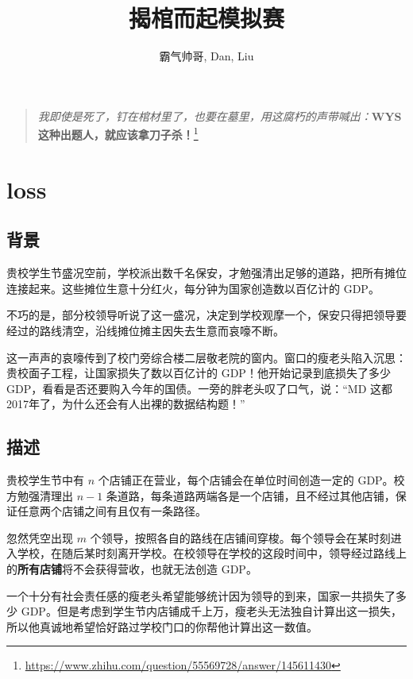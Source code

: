 \documentclass{ctexart}
\begin{document}
\title{揭棺而起模拟赛}
\author{霸气帅哥, Dan, Liu}

\maketitle

\newpage

\vspace*{\fill}
\begin{quote}
  \textit{我即使是死了，钉在棺材里了，也要在墓里，用这腐朽的声带喊出：}\textbf{WYS 这种出题人，就应该拿刀子杀！}\footnote{\url{https://www.zhihu.com/question/55569728/answer/145611430}}
\end{quote}
\vspace*{\fill}

\newpage

\section{loss}
\subsection{背景}
贵校学生节盛况空前，学校派出数千名保安，才勉强清出足够的道路，把所有摊位连接起来。这些摊位生意十分红火，每分钟为国家创造数以百亿计的 GDP。

不巧的是，部分校领导听说了这一盛况，决定到学校观摩一个，保安只得把领导要经过的路线清空，沿线摊位摊主因失去生意而哀嚎不断。

这一声声的哀嚎传到了校门旁综合楼二层敬老院的窗内。窗口的瘦老头陷入沉思：贵校面子工程，让国家损失了数以百亿计的 GDP！他开始记录到底损失了多少 GDP，看看是否还要购入今年的国债。一旁的胖老头叹了口气，说：“MD 这都2017年了，为什么还会有人出裸的数据结构题！”

\subsection{描述}
贵校学生节中有 $n$ 个店铺正在营业，每个店铺会在单位时间创造一定的 GDP。校方勉强清理出 $n-1$ 条道路，每条道路两端各是一个店铺，且不经过其他店铺，保证任意两个店铺之间有且仅有一条路径。

忽然凭空出现 $m$ 个领导，按照各自的路线在店铺间穿梭。每个领导会在某时刻进入学校，在随后某时刻离开学校。在校领导在学校的这段时间中，领导经过路线上的\textbf{所有店铺}将不会获得营收，也就无法创造 GDP。

一个十分有社会责任感的瘦老头希望能够统计因为领导的到来，国家一共损失了多少 GDP。但是考虑到学生节内店铺成千上万，瘦老头无法独自计算出这一损失，所以他真诚地希望恰好路过学校门口的你帮他计算出这一数值。
\end{document}
